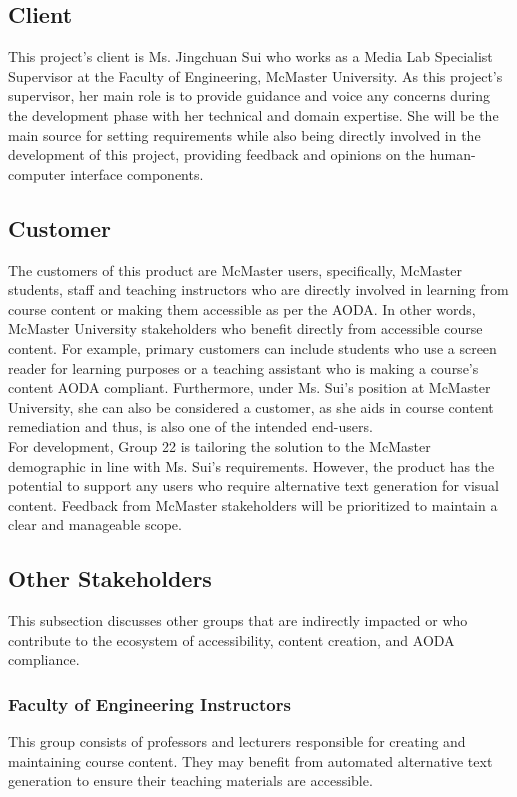 \documentclass[12pt]{article}
\begin{document}
\subsection{Client}
This project's client is Ms. Jingchuan Sui who works as a Media Lab
Specialist Supervisor at the Faculty of Engineering, McMaster
University. As this project's supervisor, her main role is to provide
guidance and voice any concerns during the development phase with her
technical and domain expertise. She will be the main source for
setting requirements while also being directly involved in the
development of this project, providing feedback and opinions on the
human-computer interface components.
\subsection{Customer}
The customers of this product are McMaster users, specifically,
McMaster students, staff and teaching instructors who are directly
involved in learning from course content or making them accessible as per the AODA.
 In other
words, McMaster University stakeholders who benefit directly from
accessible course content. For
example, primary customers can include students who use a screen reader for
learning purposes or
a teaching assistant who is making a course's content AODA compliant.
Furthermore, under Ms. Sui's
position at McMaster University, she can also be considered a
customer, as she aids in course content remediation and thus, is also
one of the intended end-users.\\
For development, Group 22 is tailoring the solution to the
McMaster demographic in line with Ms. Sui’s requirements. However,
the product has the potential to support any users who require
alternative text generation for visual content. Feedback from
McMaster stakeholders will be prioritized to maintain a clear and
manageable scope.
\subsection{Other Stakeholders}
This subsection discusses other groups that are indirectly impacted
or who contribute to the ecosystem of accessibility, content
creation, and AODA compliance.
\subsubsection {Faculty of Engineering Instructors}
This group consists of professors and lecturers responsible for
creating and maintaining
course content. They may benefit from automated alternative text generation
to ensure their teaching materials are accessible.
\end{document}
